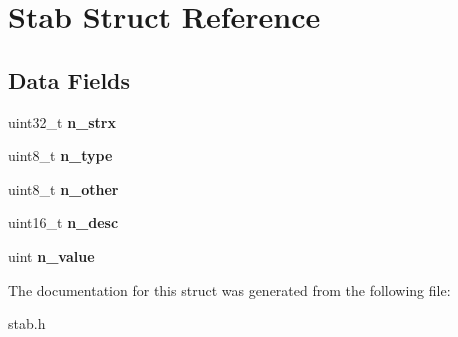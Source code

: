 \hypertarget{structStab}{}\section{Stab Struct Reference}
\label{structStab}
\subsection*{Data Fields}
\begin{DoxyCompactItemize}
\item 
uint32\+\_\+t {\bfseries n\+\_\+strx}\hypertarget{structStab_a8d874c575cc5137432a0b5fd0b202119}{}\label{structStab_a8d874c575cc5137432a0b5fd0b202119}

\item 
uint8\+\_\+t {\bfseries n\+\_\+type}\hypertarget{structStab_a4952b6befb5edaaa136fd49b7a52ddc8}{}\label{structStab_a4952b6befb5edaaa136fd49b7a52ddc8}

\item 
uint8\+\_\+t {\bfseries n\+\_\+other}\hypertarget{structStab_a70852cf6c049c690f0b7a93aab5fffbf}{}\label{structStab_a70852cf6c049c690f0b7a93aab5fffbf}

\item 
uint16\+\_\+t {\bfseries n\+\_\+desc}\hypertarget{structStab_a19fc71754b1c75e5dcd59f1522301f2d}{}\label{structStab_a19fc71754b1c75e5dcd59f1522301f2d}

\item 
uint {\bfseries n\+\_\+value}\hypertarget{structStab_a934b1b9ccdfb7c332b0513f9d460bed5}{}\label{structStab_a934b1b9ccdfb7c332b0513f9d460bed5}

\end{DoxyCompactItemize}


The documentation for this struct was generated from the following file\+:\begin{DoxyCompactItemize}
\item 
stab.\+h\end{DoxyCompactItemize}
